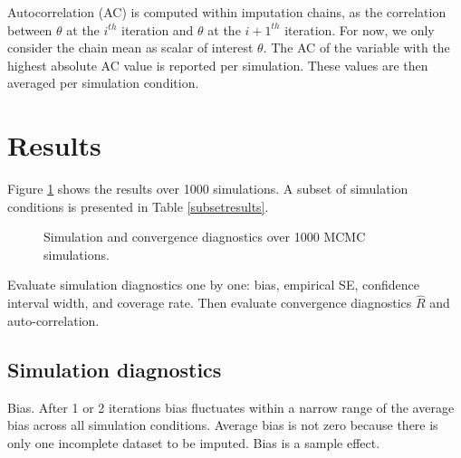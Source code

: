 \documentclass[article]{jss}
\begin{document}
Autocorrelation (AC) is computed within imputation chains, as the correlation between $\theta$ at the $i^{th}$ iteration and $\theta$ at the $i+1^{th}$ iteration. For now, we only consider the chain mean as scalar of interest $\theta$. The AC of the variable with the highest absolute AC value is reported per simulation. These values are then averaged per simulation condition.




\section{Results}

Figure \ref{resultssim} shows the results over 1000 simulations. A subset of simulation conditions is presented in Table \ref{subsetresults}. 

\begin{figure}[h]
  \caption{Simulation and convergence diagnostics over 1000 MCMC simulations.}
    \label{resultssim}
\end{figure}

Evaluate simulation diagnostics one by one: bias, empirical SE, confidence interval width, and coverage rate. Then evaluate convergence diagnostics $\widehat{R}$ and auto-correlation.

\subsection{Simulation diagnostics}
Bias. After 1 or 2 iterations bias fluctuates within a narrow range of the average bias across all simulation conditions. Average bias is not zero because there is only one incomplete dataset to be imputed. Bias is a sample effect.
\end{document}
